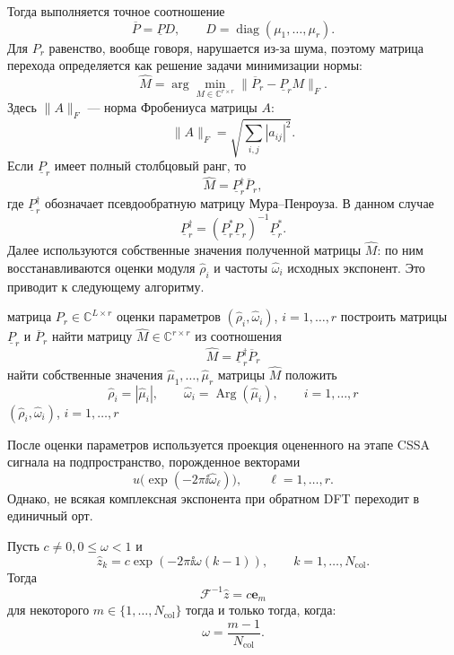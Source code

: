 Тогда выполняется точное соотношение
\[
\overline P=\underline P D,
\qquad
D=\operatorname{diag}(\mu_1,\dots,\mu_r).
\]
Для $P_r$ равенство, вообще говоря, нарушается из-за шума,
поэтому матрица перехода определяется как решение задачи минимизации нормы:
\[
\widehat M
=
\arg\min_{M\in\mathbb C^{r\times r}}
\|\overline P_r-\underline P_r M\|_F.
\]
Здесь $\|A\|_F$ --- норма Фробениуса матрицы $A$:
\[
\|A\|_F=\sqrt{\sum_{i,j}|a_{ij}|^2}.
\]
Если $\underline P_r$ имеет полный столбцовый ранг, то
\[
\widehat M=\underline P_r^\dagger\overline P_r,
\]
где $\underline P_r^\dagger$ обозначает псевдообратную матрицу
Мура--Пенроуза. В данном случае
$$\underline P_r^\dagger=(\underline P_r^{*}\underline P_r)^{-1}\underline P_r^{*}.$$
Далее используются собственные значения полученной матрицы $\widehat M$:
по ним восстанавливаются оценки модуля $\widehat\rho_i$ и частоты $\widehat\omega_i$ исходных экспонент.
Это приводит к следующему алгоритму.

\begin{algorithm}[H]
	\caption{ESPRIT}
	\begin{algorithmic}[1]
		\Require матрица $P_r\in\mathbb C^{L\times r}$
        \Ensure оценки параметров $(\widehat\rho_i,\widehat\omega_i)$, $i=1,\dots,r$
		\State построить матрицы $\underline P_r$ и $\overline P_r$
        \State найти матрицу $\widehat M\in\mathbb C^{r\times r}$ из соотношения
		\[
        \widehat M=\underline P_r^\dagger\overline P_r
		\]
        \State найти собственные значения $\widehat\mu_1,\dots,\widehat\mu_r$ матрицы $\widehat M$
		\State положить
		\[
        \widehat\rho_i=|\widehat\mu_i|,
		\qquad
        \widehat\omega_i=\operatorname{Arg}(\widehat\mu_i),
		\qquad i=1,\dots,r
		\]
        \State \Return $(\widehat\rho_i,\widehat\omega_i)$, $i=1,\dots,r$
	\end{algorithmic}
\end{algorithm}
После оценки параметров используется проекция оцененного на этапе CSSA сигнала на подпространство, порожденное
векторами
\[
u\bigl(\exp(-2\pi\ii\widehat\omega_\ell)\bigr),
\qquad \ell=1,\dots,r.
\]
Однако, не всякая комплексная экспонента при обратном DFT переходит в единичный орт.
\begin{statement}
Пусть $c\ne0, 0 \le \omega < 1$ и
\[
\widehat z_k
=
c\exp\!\left(-2\pi\ii\omega(k-1)\right),
\qquad
k=1,\dots, N_{\mathrm{col}}.
\]
Тогда
\[
\mathcal F^{-1}\widehat z=c\mathbf e_m
\]
для некоторого $m\in\{1,\dots,N_{\mathrm{col}}\}$ тогда и только тогда, когда:
\[
\omega = \frac{m-1}{N_{\mathrm{col}}}.
\]
\end{statement}

